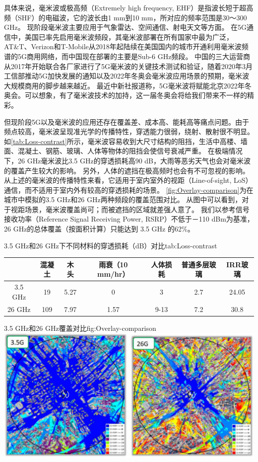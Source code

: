 \documentclass[supercite]{HustGraduPaper}
\begin{document}
具体来说，毫米波或极高频（Extremely high frequency, EHF）是指波长短于超高频（SHF）的电磁波，它的波长由1 mm到10 mm，所对应的频率范围是30～300 GHz\cite{enwiki:1021979549}。
现阶段毫米波主要应用于气象雷达、空间通信、射电天文等方面。
在5G通信中，美国已率先启用毫米波频段，其毫米波部署在所有国家中最为广泛，AT\&T、Verizon和T-Mobile从2018年起陆续在美国国内的城市开通利用毫米波频谱的5G商用网络，而中国现在部署的主要是Sub-6 GHz频段\cite{ZTE2020}。
中国的三大运营商从2017年开始联合各厂家进行了5G毫米波的关键技术测试和验证，随着2020年3月工信部推动5G加快发展的通知以及2022年冬奥会毫米波应用场景的预期，毫米波大规模商用的脚步越来越近\cite{ZTE2020}。
最近中新社报道称，5G毫米波将赋能北京2022年冬奥会。可以想象，有了毫米波技术的加持，这一届冬奥会将给我们带来不一样的精彩。

但现阶段5G以及毫米波的应用还存在覆盖差、成本高、能耗高等痛点问题。由于频点较高，毫米波呈现准光学的传播特性，穿透能力很弱，绕射、散射很不明显。
如\autoref{tab:Loss-contrast}所示，毫米波容易收到大尺寸结构的阻挡，生活中高楼、墙面、混凝土、钢筋、玻璃、人体等物体的阻挡会使信号衰减严重。
在极端情况下，26 GHz毫米波比3.5 GHz的穿透损耗高90 dB，大雨等恶劣天气也会对毫米波的覆盖产生较大的影响\cite{8732419}。
另外，人体的遮挡在极高频时也会有不可忽视的影响。
从上述的毫米波的传播特性来看，它适用于室内室外的视距（Line-of-sight, LoS）通信，而不适用于室内外有较高的穿透损耗的场景。
\autoref{fig:Overlay-comparison}为在城市中模拟的3.5 GHz和26 GHz两种频段的覆盖范围对比。
从图中可以看到，对于视距场景，毫米波覆盖尚可；而被遮挡的区域就差强人意了。
我们以参考信号接收功率（Reference Signal Receiving Power, RSRP）不低于－110 dBm为基准，26 GHz的总体覆盖（按面积计算）只能达到 3.5 GHz 的62\%\cite{ZTE2020}。

\begin{generaltab}{3.5 GHz和26 GHz下不同材料的穿透损耗（dB）对比\cite{ZTE2020}}{tab:Loss-contrast}
	\begin{tabular}{ccccccc}
		\toprule
		        & 混凝土 &  木头  & 雨衰（10 mm/hr） & 人体损耗 & 普通多层玻璃 & IRR玻璃 \\ \midrule
		3.5 GHz & 19  & 5.27 &      0       &  3   &  2.7   & 24.05 \\
		26 GHz  & 109 & 7.97 &     1.57     & 9-13 &  7.2   & 30.8  \\ \bottomrule
	\end{tabular}
\end{generaltab}

\begin{generalfig}[htb]{3.5 GHz和26 GHz覆盖对比\cite{ZTE2020}}{fig:Overlay-comparison}
	\includegraphics[width=0.8\linewidth]{Figures/Overlay-comparison.JPG}
\end{generalfig}
\end{document}
